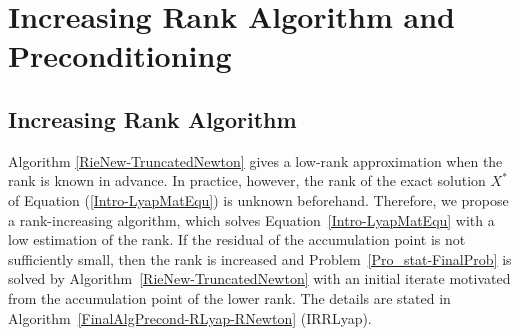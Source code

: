 \documentclass[11pt]{article}
\numberwithin{equation}{section}
\begin{document}
\section{Increasing Rank Algorithm and Preconditioning} \label{FinalAlgPrecond}

\subsection{Increasing Rank Algorithm}

Algorithm \ref{RieNew-TruncatedNewton} gives a low-rank approximation when the rank is known in advance. 
In practice, however, the rank of the exact solution $X^*$ of Equation (\ref{Intro-LyapMatEqu}) is unknown beforehand. 
Therefore, we propose a rank-increasing algorithm, which solves Equation~\eqref{Intro-LyapMatEqu} with a low estimation of the rank. If the residual of the accumulation point is not sufficiently small, then the rank is increased and Problem~\eqref{Pro_stat-FinalProb} is solved by Algorithm~\ref{RieNew-TruncatedNewton} with an initial iterate motivated from the accumulation point of the lower rank. 
The details are stated in Algorithm~\ref{FinalAlgPrecond-RLyap-RNewton} (IRRLyap).
\end{document}
